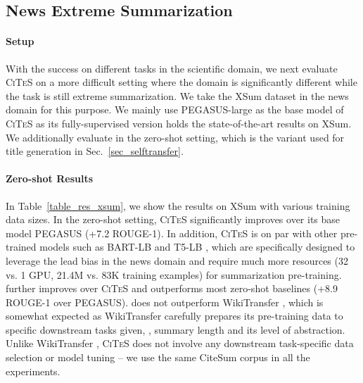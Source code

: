 \documentclass[11pt]{article}
\newcommand{\ours}{\textsc{CiTeS}\xspace}
\newcommand{\oursTitle}{\xspace}
\newcommand{\ourdata}{CiteSum\xspace}
\begin{document}
\subsection{News Extreme Summarization}
\label{sec_transfer_xsum}
\paragraph{Setup}
With the success on different tasks in the scientific domain, we next evaluate \ours on a more difficult setting where the domain is significantly different while the task is still extreme summarization.
We take the XSum dataset \cite{narayan-etal-2018-dont} in the news domain for this purpose.
We mainly use PEGASUS-large \cite{zhang2020pegasus} as the base model of \ours as its fully-supervised version holds the state-of-the-art results on XSum.
We additionally evaluate \oursTitle in the zero-shot setting, which is the variant used for title generation in Sec.~\ref{sec_selftransfer}.




\paragraph{Zero-shot Results}
In Table~\ref{table_res_xsum}, we show the results on XSum with various training data sizes.
In the zero-shot setting, \ours significantly improves over its base model PEGASUS (+7.2 ROUGE-1).
In addition, \ours is on par with other pre-trained models such as BART-LB and T5-LB \cite{zhu2021leveraging}, which are specifically designed to leverage the lead bias in the news domain and require much more resources (32 vs. 1 GPU, 21.4M vs. 83K training examples) for summarization pre-training.
\oursTitle further improves over \ours and outperforms most zero-shot baselines (+8.9 ROUGE-1 over PEGASUS).
\oursTitle does not outperform WikiTransfer \cite{fabbri-etal-2021-improving}, which is somewhat expected as WikiTransfer carefully prepares its pre-training data to specific downstream tasks given, \eg, summary length and its level of abstraction.
Unlike WikiTransfer \cite{fabbri-etal-2021-improving}, \ours does not involve any downstream task-specific data selection or model tuning -- we use the same \ourdata corpus in all the experiments.
\end{document}
